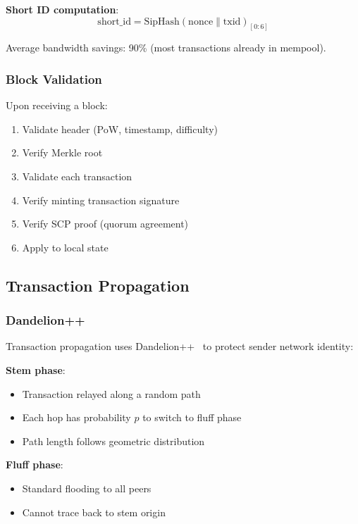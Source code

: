 \textbf{Short ID computation}:
\begin{equation}
\text{short\_id} = \text{SipHash}(\text{nonce} \| \text{txid})_{[0:6]}
\end{equation}

Average bandwidth savings: 90\% (most transactions already in mempool).

\subsubsection{Block Validation}

Upon receiving a block:
\begin{enumerate}
  \item Validate header (PoW, timestamp, difficulty)
  \item Verify Merkle root
  \item Validate each transaction
  \item Verify minting transaction signature
  \item Verify SCP proof (quorum agreement)
  \item Apply to local state
\end{enumerate}

\subsection{Transaction Propagation}

\subsubsection{Dandelion++}

Transaction propagation uses Dandelion++~\cite{dandelion} to protect
sender network identity:

\textbf{Stem phase}:
\begin{itemize}
  \item Transaction relayed along a random path
  \item Each hop has probability $p$ to switch to fluff phase
  \item Path length follows geometric distribution
\end{itemize}

\textbf{Fluff phase}:
\begin{itemize}
  \item Standard flooding to all peers
  \item Cannot trace back to stem origin
\end{itemize}

